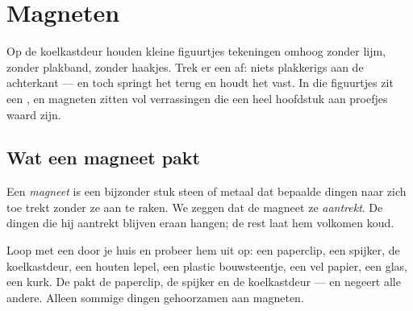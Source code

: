 \chapter{Magneten}\label{ch:g1:magnets}

Op de koelkastdeur houden kleine figuurtjes tekeningen omhoog zonder
lijm, zonder plakband, zonder haakjes. Trek er een af: niets plakkerigs
aan de achterkant --- en toch springt het terug en houdt het vast. In
die figuurtjes zit een , en magneten zitten vol verrassingen
die een heel hoofdstuk aan proefjes waard zijn.

\section{Wat een magneet pakt}

\begin{definition}[Magneten]\label{def:g1:magnets:magnet}
Een \emph{magneet} is een bijzonder stuk steen of
metaal dat bepaalde dingen naar zich toe trekt zonder ze aan te raken.
We zeggen dat de magneet ze \emph{aantrekt}. De
dingen die hij aantrekt blijven eraan hangen; de rest laat hem
volkomen koud.
\end{definition}

\begin{example}\label{ex:g1:magnets:test}
Loop met een  door je huis en probeer hem uit op: een paperclip,
een spijker, de koelkastdeur, een houten lepel, een plastic
bouwsteentje, een vel papier, een glas, een kurk. De  pakt de
paperclip, de spijker en de koelkastdeur --- en negeert alle andere.
Alleen sommige dingen gehoorzamen aan magneten.
\end{example}

